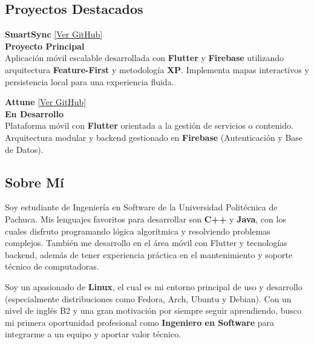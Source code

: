 \documentclass[10pt,a4paper]{article}
\begin{document}
\begin{minipage}[t]{0.48\textwidth}

\begin{tcolorbox}[cvcard]
\section*{Proyectos Destacados}

\textbf{\large SmartSync} \href{https://github.com/CodeMakeSoft/SS.git}{\normalsize [Ver GitHub]}\\[0.1em]
{\color{accent} \bfseries Proyecto Principal}\\[0.2em]
{\color{textmuted} Aplicación móvil escalable desarrollada con \textbf{Flutter} y \textbf{Firebase} utilizando arquitectura \textbf{Feature-First} y metodología \textbf{XP}. Implementa mapas interactivos y persistencia local para una experiencia fluida.}

\vspace{1em}
\textbf{\large Attune} \href{https://github.com/CodeMakeSoft/Attune.git}{\normalsize [Ver GitHub]}\\[0.1em]
{\color{accent} \bfseries En Desarrollo}\\[0.2em]
{\color{textmuted} Plataforma móvil con \textbf{Flutter} orientada a la gestión de servicios o contenido. Arquitectura modular y backend gestionado en \textbf{Firebase} (Autenticación y Base de Datos).}
\end{tcolorbox}

\vspace{1em}

\begin{tcolorbox}[cvcard]
\section*{Sobre Mí}
{\color{textmuted}
Soy estudiante de Ingeniería en Software de la Universidad Politécnica de Pachuca. Mis lenguajes favoritos para desarrollar son \textbf{C++} y \textbf{Java}, con los cuales disfruto programando lógica algorítmica y resolviendo problemas complejos. También me desarrollo en el área móvil con Flutter y tecnologías backend, además de tener experiencia práctica en el mantenimiento y soporte técnico de computadoras.

Soy un apasionado de \textbf{Linux}, el cual es mi entorno principal de uso y desarrollo (especialmente distribuciones como Fedora, Arch, Ubuntu y Debian). Con un nivel de inglés B2 y una gran motivación por siempre seguir aprendiendo, busco mi primera oportunidad profesional como \textbf{Ingeniero en Software} para integrarme a un equipo y aportar valor técnico.
}
\end{tcolorbox}

\end{minipage}
\end{document}
